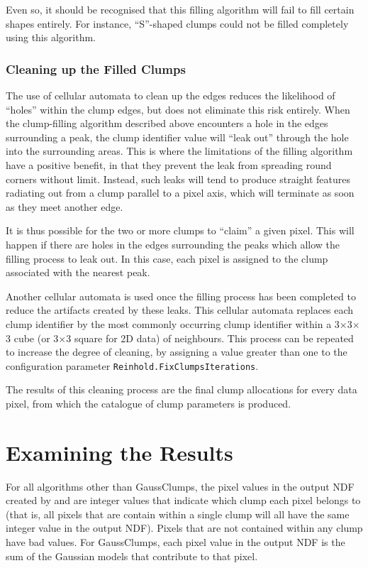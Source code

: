 \documentclass[twoside,11pt]{starlink}
\begin{document}
Even so, it should be recognised that this filling algorithm will fail to
fill certain shapes entirely. For instance, ``S''-shaped clumps could not
be filled completely using this algorithm.

\subsubsection{Cleaning up the Filled Clumps}
The use of cellular automata to clean up the edges reduces the likelihood
of ``holes'' within the clump edges, but does not eliminate this risk
entirely. When the clump-filling algorithm described above encounters a
hole in the edges surrounding a peak, the clump identifier value will
``leak out'' through the hole into the surrounding areas. This is where the
limitations of the filling algorithm have a positive benefit, in that they
prevent the leak from spreading round corners without limit. Instead, such
leaks will tend to produce straight features radiating out from a clump
parallel to a pixel axis, which will terminate as soon as they meet another
edge.

It is thus possible for the two or more clumps to ``claim'' a given
pixel. This will happen if there are holes in the edges surrounding the
peaks which allow the filling process to leak out. In this case, each
pixel is assigned to the clump associated with the nearest peak.

Another cellular automata is used once the filling process has been
completed to reduce the artifacts created by these leaks. This cellular
automata replaces each clump identifier by the most commonly occurring
clump identifier within a 3$\times$3$\times$3 cube (or 3$\times$3 square
for 2D data) of
neighbours. This process can be repeated to increase the degree of
cleaning, by assigning a value greater than one to the configuration
parameter \texttt{Reinhold.FixClumpsIterations}.

The results of this cleaning process are the final clump allocations for
every data pixel, from which the catalogue of clump parameters is produced.

\section{Examining the Results}

For all algorithms other than GaussClumps, the pixel values in the output
NDF created by  and
 are integer values that indicate
which clump each pixel belongs to (that is, all pixels that are contain
within a single clump will all have the same integer value in the output
NDF). Pixels that are not contained within any clump have bad values.
For GaussClumps, each pixel value in the output NDF is the sum of the
Gaussian models that contribute to that pixel.
\end{document}
